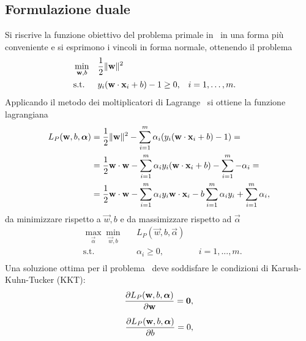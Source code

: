 \subsection{Formulazione duale}\label{subsec:hard_margin_dual}
Si riscrive la funzione obiettivo del problema primale in~ in una forma più conveniente e si esprimono i vincoli in forma normale, ottenendo il problema
\begin{equation}\label{eq:svc:hardmargin:primal_convenient}
\begin{aligned}
& \min_{\Vec{w},b}    && \frac{1}{2}\norm{\Vec{w}}^2 \\
& \textrm{s.t.} && y_i(\Vec{w}\cdot \Vec{x}_i + b) - 1 \geq 0, && i=1,\dots,m. \\
\end{aligned}
\end{equation}
%
Applicando il metodo dei moltiplicatori di Lagrange~\cite{optimization_book} si ottiene la funzione lagrangiana
\begin{equation}
\label{eq:svc:hardmargin:lagrangian}
\begin{split}
L_P(\Vec{w},b, \vec{\alpha})  & = \frac{1}{2}\norm{\Vec{w}}^2 - \sum_{i=1}^{m} \alpha_i (y_i(\Vec{w}\cdot \Vec{x}_i +b) -1) =\\
        & = \frac{1}{2}\Vec{w} \cdot \Vec{w} - \sum_{i=1}^{m} \alpha_i y_i(\Vec{w}\cdot \Vec{x}_i +b) -  \sum_{i=1}^{m} - \alpha_i = \\
        & = \frac{1}{2}\Vec{w}\cdot\Vec{w} - \sum_{i=1}^{m} \alpha_i y_i \Vec{w}\cdot \Vec{x}_i - b \sum_{i=1}^{m} \alpha_i y_i + \sum_{i=1}^{m} \alpha_i,
\end{split}
\end{equation}
da minimizzare rispetto a $\Vec{w},b$ e da massimizzare rispetto ad $\Vec{\alpha}$ 
\begin{equation}
\label{eq:svc:hardmargin:max_min}
\begin{aligned}
& \max_{\vec{\alpha}} \min_{\Vec{w}, b} && L_P(\Vec{w},b, \Vec{\alpha}) \\
& \textrm{s.t.} && \alpha_i \geq 0, && i=1,..., m.\\
\end{aligned}
\end{equation}
%
%
Una soluzione ottima per il problema~ deve soddisfare le condizioni di Karush-Kuhn-Tucker (KKT)\cite{svm_tutorial,optimization_book}:
\begin{align}
    \label{eq:svc:hardmargin:kkt1}
    \pd{L_P(\Vec{w},b,\vec{\alpha})}{\Vec{w}} = \Vec{0}, \\[2mm]
    \label{eq:svc:hardmargin:kkt2}
    \pd{L_P(\Vec{w},b,\vec{\alpha})}{b} = 0, 
\end{align}
